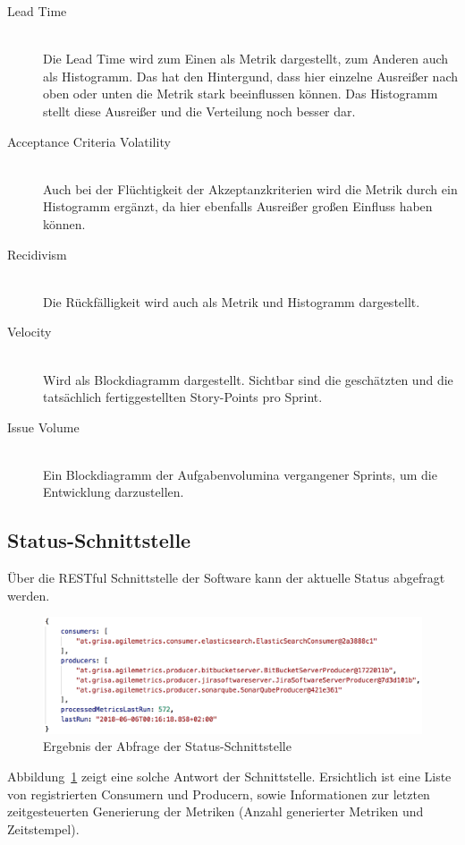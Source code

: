 \clearpage
\begin{description}
    \item[Lead Time] \hfill \\ Die Lead Time wird zum Einen als Metrik dargestellt, zum Anderen auch als Histogramm. Das hat den Hintergund, dass hier einzelne Ausreißer nach oben oder unten die Metrik stark beeinflussen können. Das Histogramm stellt diese Ausreißer und die Verteilung noch besser dar.
    \item[Acceptance Criteria Volatility] \hfill \\ Auch bei der Flüchtigkeit der Akzeptanzkriterien wird die Metrik durch ein Histogramm ergänzt, da hier ebenfalls Ausreißer großen Einfluss haben können.
    \item[Recidivism] \hfill \\ Die Rückfälligkeit wird auch als Metrik und Histogramm dargestellt.
    \item[Velocity] \hfill \\ Wird als Blockdiagramm dargestellt. Sichtbar sind die geschätzten und die tatsächlich fertiggestellten Story-Points pro Sprint.
    \item[Issue Volume] \hfill \\ Ein Blockdiagramm der Aufgabenvolumina vergangener Sprints, um die Entwicklung darzustellen.
\end{description}

\newpage
\subsection{Status-Schnittstelle}

Über die RESTful Schnittstelle der Software kann der aktuelle Status abgefragt werden.

\begin{savenotes}
    \begin{figure}[H] 
        \centering
            \includegraphics[width=1.0\textwidth]{img/status-api.png}
        \caption{Ergebnis der Abfrage der Status-Schnittstelle}\label{fig:status-api}
    \end{figure}
\end{savenotes}

Abbildung~\ref{fig:status-api} zeigt eine solche Antwort der Schnittstelle. 
Ersichtlich ist eine Liste von registrierten Consumern und Producern, sowie Informationen zur letzten zeitgesteuerten Generierung der Metriken (Anzahl generierter Metriken und Zeitstempel).
